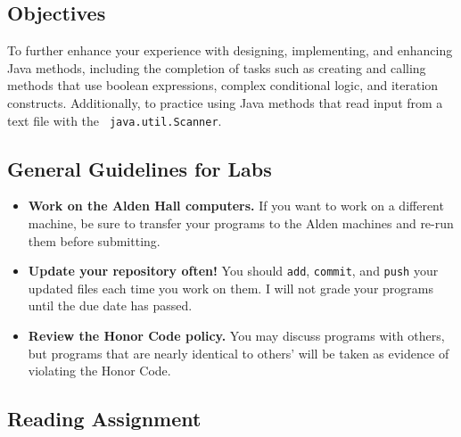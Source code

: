 



\vspace{-0.2in}
\subsection*{Objectives}
\vspace{-0.05in}

To further enhance your experience with designing, implementing, and enhancing Java methods, including the completion of
tasks such as creating and calling methods that use boolean expressions, complex conditional logic, and iteration
constructs.  Additionally, to practice using Java methods that read input from a text file with the {\tt
  java.util.Scanner}.

\vspace{-0.15in}
\subsection*{General Guidelines for Labs}
\vspace{-0.05in}

\begin{itemize}
\item
{\bf Work on the Alden Hall computers.} If you want to work on a different
machine, be sure to transfer your programs to the Alden
machines and re-run them before submitting.
\item
  {\bf Update your repository often!} You should {\tt add}, {\tt commit}, 
  and {\tt push} your updated files each time you work on them.  I will not grade 
your programs until the due date has passed.
\item
{\bf Review the Honor Code policy.} You
may discuss programs with others, but programs that are nearly identical
to others' will be taken as evidence of violating the Honor Code.
\end{itemize}

\vspace{-0.15in}
\subsection*{Reading Assignment}
\vspace{-0.05in}

